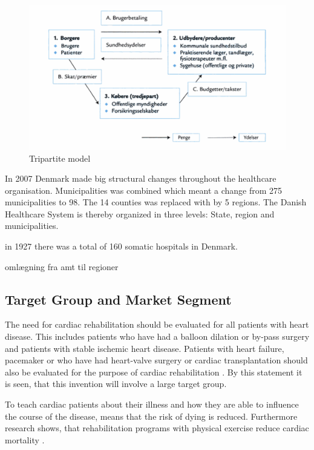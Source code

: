 \begin{figure}[H]
\centering
\includegraphics[width=1\textwidth]{Figure/tredjepart.png}
\caption{Tripartite model \cite{sundhedsvaesen}}
\label{Trepartmodel}
\end{figure} 

In 2007 Denmark made big structural changes throughout the healthcare organisation. Municipalities was combined which meant a change from 275 municipalities to 98. The 14 counties was replaced with by 5 regions. The Danish Healthcare System is thereby organized in three levels: State, region and municipalities.

 in 1927 there was a total of 160 somatic hospitals in Denmark. 



omlægning fra amt til regioner
\cite{sundhedsvaesen}
\subsection{Target Group and Market Segment}

The need for cardiac rehabilitation should be evaluated for all patients with heart disease. This includes patients who have had a balloon dilation or by-pass surgery and patients with stable ischemic heart disease.
Patients with heart failure, pacemaker or who have had heart-valve surgery or cardiac transplantation should also be evaluated for the purpose of cardiac rehabilitation \cite{Rehabilitering}. By this statement it is seen, that this invention will involve a large target group. 

To teach cardiac patients about their illness and how they are able to influence the course of the disease, means that the risk of dying is reduced. Furthermore research shows, that rehabilitation programs with physical exercise reduce cardiac mortality \cite{Hjerteforening}.    



